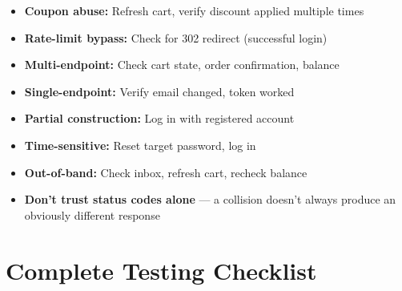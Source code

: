 \documentclass[11pt]{article}
\begin{document}
\begin{checklistbox}
\begin{itemize}
    \item[\checkmark] \textbf{Coupon abuse:} Refresh cart, verify discount applied multiple times
    \item[\checkmark] \textbf{Rate-limit bypass:} Check for 302 redirect (successful login)
    \item[\checkmark] \textbf{Multi-endpoint:} Check cart state, order confirmation, balance
    \item[\checkmark] \textbf{Single-endpoint:} Verify email changed, token worked
    \item[\checkmark] \textbf{Partial construction:} Log in with registered account
    \item[\checkmark] \textbf{Time-sensitive:} Reset target password, log in
    \item[\checkmark] \textbf{Out-of-band:} Check inbox, refresh cart, recheck balance
    \item[\checkmark] \textbf{Don't trust status codes alone} — a collision doesn't always produce an obviously different response
\end{itemize}
\end{checklistbox}

\section{Complete Testing Checklist}
\end{document}
